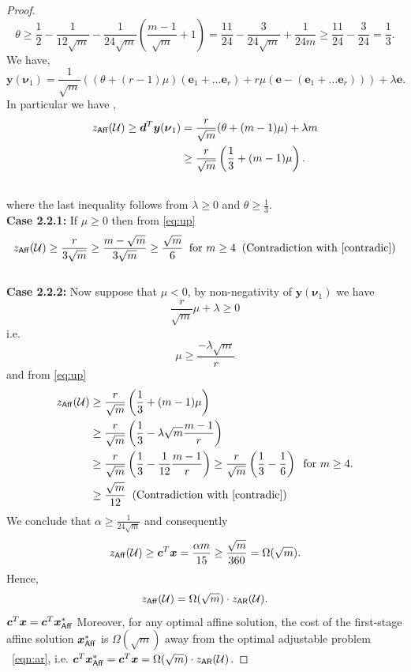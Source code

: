\documentclass[11pt]{article}
\theoremstyle{plain}
\theoremstyle{definition}
\numberwithin{equation}{section}%
\numberwithin{equation}{section}%
\newcommand{\mb}[1]{\ensuremath{\boldsymbol{#1}}}
\begin{document}
\begin{appendix}
{\begin{proof}
$$ \theta \geq \frac{1}{2}- \frac{1}{12\sqrt{m}} -  \frac{1}{24\sqrt{m}}\left( \frac{m-1}{\sqrt{m}} +1 \right)   = \frac{11}{24} - \frac{3}{24 \sqrt{m}} + \frac{1}{24m}
 \geq \frac{11}{24} - \frac{3}{24 }= \frac{1}{3}.$$
We have,
$$ \mb y ( \mb \nu_1 )  =  \frac{1}{\sqrt{m}}     \left( ( \theta + (r-1) \mu ) ( \mb e_1+ \ldots \mb e_r)   + r \mu ( \mb e -( \mb e_1+ \ldots \mb e_r)) \right) + \lambda \mb e. $$
In particular we have ,
\begin{align} \label{eq:up} \nonumber
 z_{\sf Aff}({\cal U}) \geq \mb d^T \mb y (\mb \nu_1) &= \frac{r}{\sqrt{m}} (  \theta +(m-1) \mu) + \lambda m \\
 & \geq    \frac{r}{\sqrt{m}} \left(  \frac{1}{3} + (m-1) \mu \right).\\ \nonumber
\end{align}
where the last inequality follows from $\lambda \geq 0$ and $ \theta \geq \frac{1}{3}.$\\
{\bf Case 2.2.1:} If $ \mu \geq 0$ then from \eqref{eq:up}
$$ z_{\sf Aff}({\cal U}) \geq  \frac{r}{3\sqrt{m}} \geq  \frac{m-\sqrt{m}}{3\sqrt{m}} \geq \frac{\sqrt{m}}{6}    \; \;  \text{for }  m \geq 4  \; \;  (\text{Contradiction with \eqref{contradic}})$$\\
{\bf Case 2.2.2:} Now suppose that $ \mu < 0$, by non-negativity of $ \mb y ( \mb \nu_1) $ we have
$$ \frac{r}{\sqrt{m}} \mu + \lambda \geq 0$$
i.e. $$ \mu \geq \frac{-\lambda \sqrt{m}}{r}  $$
and from \eqref{eq:up}
\begin{align*}
 z_{\sf Aff}({\cal U})  &\geq    \frac{r}{\sqrt{m}} \left(  \frac{1}{3} + (m-1) \mu \right) \\
 & \geq  \frac{r}{\sqrt{m}}\left(  \frac{1}{3} - \lambda \sqrt{m}\frac{m-1}{r}   \right) \\
& \geq  \frac{r}{\sqrt{m}}\left(  \frac{1}{3} - \frac{1}{12} \frac{m-1}{r}  \right)  \geq   \frac{r}{\sqrt{m}}  \left(  \frac{1}{3} - \frac{1}{6}   \right)   \; \; \text{for } m \geq 4  . \\
& \geq  \frac{\sqrt{m}}{12} \; \; (\text{Contradiction with \eqref{contradic}})\\
\end{align*}
We conclude that $ \alpha \geq \frac{1}{24 \sqrt{m}}$ and consequently
 $$z_{\sf Aff}({\cal U}) \geq  \mb c^T \mb x = \frac{\alpha m}{15} \geq \frac{\sqrt{m}}{360} =  \Omega ( \sqrt{m}).$$
 Hence,  $$z_{\sf Aff}({\cal U})= \Omega ( \sqrt{m}) \cdot  z_{\sf AR}({\cal U}).$$
 $\mb c^T \mb x= \mb c^T \mb x^*_{\sf Aff}$
Moreover, for any optimal affine solution, the cost of the first-stage affine solution  $\mb x^*_{\sf Aff}$ is $ \Omega ({\sqrt{m}})$ away from the optimal adjustable problem ~\eqref{eqn:ar}, i.e. $  \mb c^T \mb x^*_{\sf Aff} =\mb c^T \mb x =\Omega ( \sqrt{m})\cdot z_{\sf AR}({\cal U})$.
  \end{proof}
}

\end{appendix}
\end{document}
